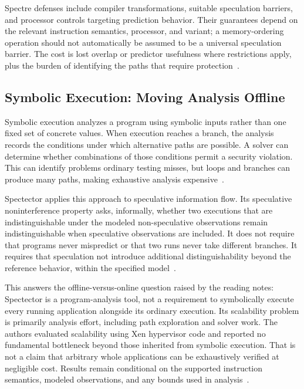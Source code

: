 \documentclass[man,12pt,apacite,nofontenc,nolmodern,floatsintext]{apa6}
\begin{document}
Spectre defenses include compiler transformations, suitable speculation barriers, and processor controls targeting prediction behavior. Their guarantees depend on the relevant instruction semantics, processor, and variant; a memory-ordering operation should not automatically be assumed to be a universal speculation barrier. The cost is lost overlap or predictor usefulness where restrictions apply, plus the burden of identifying the paths that require protection~\cite{canella2019,contracts2021}.

\subsection{Symbolic Execution: Moving Analysis Offline}
Symbolic execution analyzes a program using symbolic inputs rather than one fixed set of concrete values. When execution reaches a branch, the analysis records the conditions under which alternative paths are possible. A solver can determine whether combinations of those conditions permit a security violation. This can identify problems ordinary testing misses, but loops and branches can produce many paths, making exhaustive analysis expensive~\cite{spectector2020}.

Spectector applies this approach to speculative information flow. Its speculative noninterference property asks, informally, whether two executions that are indistinguishable under the modeled non-speculative observations remain indistinguishable when speculative observations are included. It does not require that programs never mispredict or that two runs never take different branches. It requires that speculation not introduce additional distinguishability beyond the reference behavior, within the specified model~\cite{spectector2020}.

This answers the offline-versus-online question raised by the reading notes: Spectector is a program-analysis tool, not a requirement to symbolically execute every running application alongside its ordinary execution. Its scalability problem is primarily analysis effort, including path exploration and solver work. The authors evaluated scalability using Xen hypervisor code and reported no fundamental bottleneck beyond those inherited from symbolic execution. That is not a claim that arbitrary whole applications can be exhaustively verified at negligible cost. Results remain conditional on the supported instruction semantics, modeled observations, and any bounds used in analysis~\cite{spectector2020}.
\end{document}

